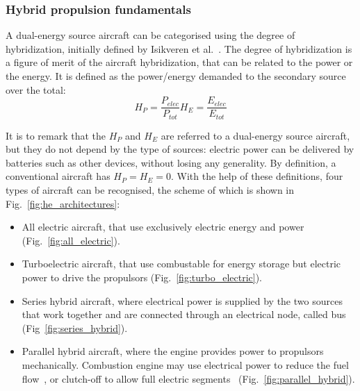 \subsubsection{Hybrid propulsion fundamentals}
\label{subsubsec:chap1_elec_fundamentals}

A dual-energy source aircraft can be categorised using the degree of hybridization, initially defined by Isikveren et al.~\cite{bib:isikveren}. 
The degree of hybridization is a figure of merit of the aircraft hybridization, that can be related to the power or the energy. 
It is defined as the power/energy demanded to the secondary source over the total:
\begin{subequations}
	\begin{equation}
		\label{eq:hp}
		H_P = \frac{P_{elec}}{P_{tot}}
	\end{equation}
	\begin{equation}
		\label{eq:he}
		H_E = \frac{E_{elec}}{E_{tot}}
	\end{equation}
\end{subequations}

It is to remark that the $H_P$ and $H_E$ are referred to a dual-energy source aircraft, but they do not depend by the type of sources: electric power can be delivered by batteries such as other devices, without losing any generality.
By definition, a conventional aircraft has $H_P=H_E=0$.
With the help of these definitions, four types of aircraft can be recognised, the scheme of which is shown in Fig.~\ref{fig:he_architectures}: 
\begin{itemize}
	
	\item All electric aircraft, that use exclusively electric energy and power (Fig.~\ref{fig:all_electric}).
	
	\item Turboelectric aircraft, that use combustable for energy storage but electric power to drive the propulsors (Fig.~\ref{fig:turbo_electric}).
	
	\item Series hybrid aircraft, where electrical power is supplied by the two sources that work together and are connected through an electrical node, called bus (Fig~\ref{fig:series_hybrid}).
	
	\item Parallel hybrid aircraft, where the engine provides power to propulsors mechanically. Combustion engine may use electrical power to reduce the fuel flow~\cite{bib:bradley_sugar_p2_v2}, or clutch-off to allow full electric segments~\cite{bib:ausserer} (Fig.~\ref{fig:parallel_hybrid}).
\end{itemize}

